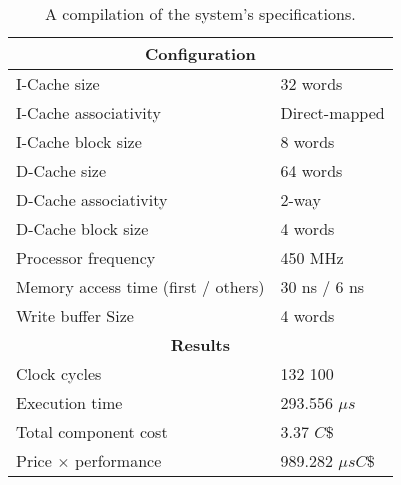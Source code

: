 \documentclass[a4paper,9pt,fleqn]{article}
\begin{document}
\begin{table}
	\center
	\large
	\def\arraystretch{1.2} 
	\begin{tabular}{|l|l|}
		\hline
		\multicolumn{2}{|c|}{\bf Configuration} 						\\ \hline
		I-Cache size							& 32 words 				\\ 
		I-Cache associativity 					& Direct-mapped			\\ 
		I-Cache block size		 				& 8 words				\\ \hline
		D-Cache size 		 					& 64 words				\\ 
		D-Cache associativity 					& 2-way					\\ 
		D-Cache block size 		 				& 4 words				\\ \hline
		Processor frequency		 				& 450 MHz				\\ \hline
		Memory access time (first / others) 	& 30 ns / 6 ns			\\ 
		Write buffer Size 		 				& 4 words				\\ \hline
		\multicolumn{2}{|c|}{\bf Results} 								\\ \hline
		Clock cycles 							& 132 100 				\\ 
		Execution time		 					& 293.556 $ \mu s $ 	\\ 
		Total component cost 					& 3.37 $ C\$ $			\\ 
		Price $ \times $ performance			& 989.282 $ \mu sC\$ $	\\ \hline
	\end{tabular}
	\label{specs}
	\caption{A compilation of the system's specifications.}
\end{table}
\end{document}
